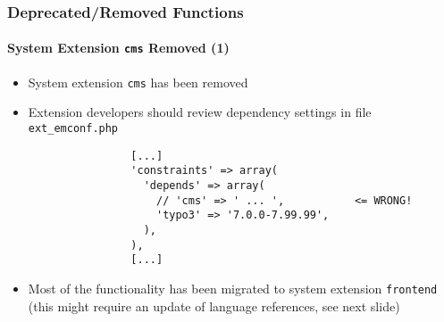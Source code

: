 \begin{frame}[fragile]
	\frametitle{Deprecated/Removed Functions}
	\framesubtitle{System Extension \texttt{cms} Removed (1)}

	\lstset{basicstyle=\tiny\ttfamily}

	\begin{itemize}

		\item System extension \texttt{cms} has been removed

		\item Extension developers should review dependency settings in file \texttt{ext\_emconf.php}

			\begin{lstlisting}
				[...]
				'constraints' => array(
				  'depends' => array(
				    // 'cms' => ' ... ',           <= WRONG!
				    'typo3' => '7.0.0-7.99.99',
				  ),
				),
				[...]
			\end{lstlisting}

		\item Most of the functionality has been migrated to system extension \texttt{frontend}
			(this might require an update of language references, see next slide)

	\end{itemize}

\end{frame}


